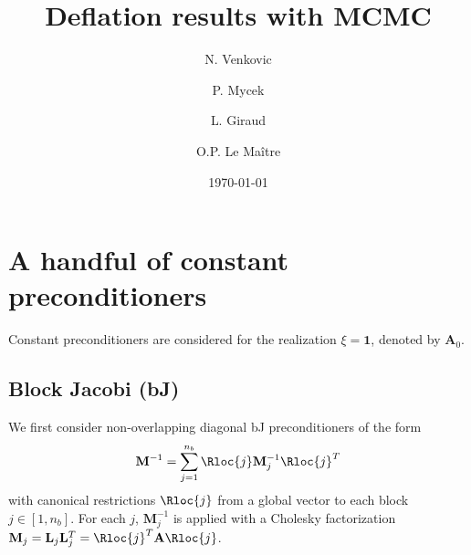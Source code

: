 \documentclass{article}
\title{Deflation results with MCMC}
\author{N. Venkovic \and P. Mycek \and L. Giraud \and O.P. Le Ma\^{i}tre}
\date{\today}
\begin{document}
\maketitle


\section{A handful of constant preconditioners}
Constant preconditioners are considered for the realization $\xi=\mathbf{1}$, denoted by $\mathbf{A}_0$.
\subsection{Block Jacobi (bJ)}
We first consider non-overlapping diagonal bJ preconditioners of the form
\begin{align}
\mathbf{M}^{-1}=\sum_{j=1}^{n_b}\Rloc{j}\mathbf{M}_j^{-1}\Rloc{j}^T
\end{align}
with canonical restrictions $\Rloc{j}$ from a global vector to each block $j\in[1,n_b]$.
For each $j$, $\mathbf{M}_j^{-1}$ is applied with a Cholesky factorization $\mathbf{M}_j=\mathbf{L}_j\mathbf{L}_j^T=\Rloc{j}^T\mathbf{A}\Rloc{j}$.
\end{document}

